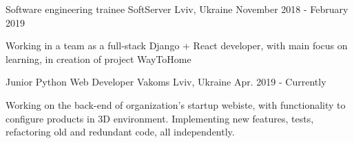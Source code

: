 
\begin{cventries}
  \cventry
    {Software engineering trainee} %
    {SoftServer} %
    {Lviv, Ukraine} %
    {November 2018 - February 2019} %
    {
      \begin{cvitems} %
        \item {Working in a team as a full-stack Django + React developer, with main focus on learning, in creation of project WayToHome}
      \end{cvitems}
    }

  \cventry
    {Junior Python Web Developer} %
    {Vakoms} %
    {Lviv, Ukraine} %
    {Apr. 2019 - Currently} %
    {
      \begin{cvitems} %
        \item {Working on the back-end of organization's startup webiste, with functionality to configure products in 3D environment. Implementing new features, tests, refactoring old and redundant code, all independently.}
      \end{cvitems}
    }

\end{cventries}
